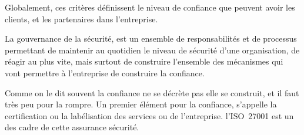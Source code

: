 Globalement, ces critères définissent le niveau de confiance que peuvent avoir les clients, et les partenaires dans l’entreprise.

La gouvernance de la sécurité, est un ensemble de responsabilités et de processus permettant de maintenir au quotidien le niveau de sécurité d’une organisation, de réagir au plus vite, mais surtout de construire l’ensemble des mécanismes qui vont permettre à l’entreprise de construire la confiance.

Comme on le dit souvent la confiance ne se décrète pas elle se construit, et il faut très peu pour la rompre. Un premier élément pour la confiance, s’appelle la certification ou la labélisation des services ou de l'entreprise. l'ISO~27001 est un des cadre de cette assurance sécurité.

\utocomplete